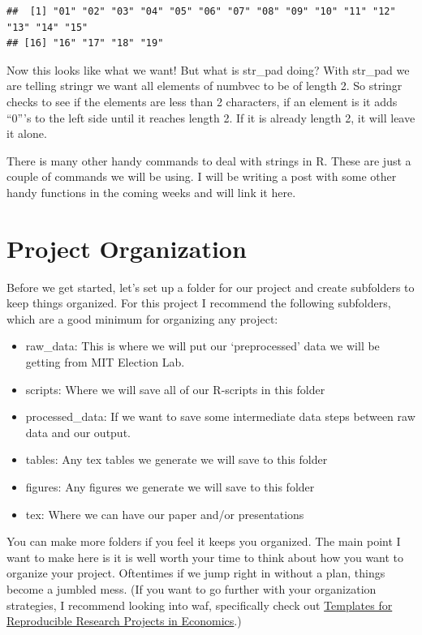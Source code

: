 \documentclass[
]{book}
\providecommand{\tightlist}{%
  \setlength{\itemsep}{0pt}\setlength{\parskip}{0pt}}
\begin{document}
\begin{verbatim}
##  [1] "01" "02" "03" "04" "05" "06" "07" "08" "09" "10" "11" "12" "13" "14" "15"
## [16] "16" "17" "18" "19"
\end{verbatim}

Now this looks like what we want! But what is str\_pad doing? With str\_pad we are telling stringr we want all elements of numbvec to be of length 2. So stringr checks to see if the elements are less than 2 characters, if an element is it adds ``0'''s to the left side until it reaches length 2. If it is already length 2, it will leave it alone.

There is many other handy commands to deal with strings in R. These are just a couple of commands we will be using. I will be writing a post with some other handy functions in the coming weeks and will link it here.

\hypertarget{project-organization}{%
\section{Project Organization}\label{project-organization}}

Before we get started, let's set up a folder for our project and create subfolders to keep things organized. For this project I recommend the following subfolders, which are a good minimum for organizing any project:

\begin{itemize}
\tightlist
\item
  raw\_data: This is where we will put our `preprocessed' data we will be getting from MIT Election Lab.
\item
  scripts: Where we will save all of our R-scripts in this folder
\item
  processed\_data: If we want to save some intermediate data steps between raw data and our output.
\item
  tables: Any tex tables we generate we will save to this folder
\item
  figures: Any figures we generate we will save to this folder
\item
  tex: Where we can have our paper and/or presentations
\end{itemize}

You can make more folders if you feel it keeps you organized. The main point I want to make here is it is well worth your time to think about how you want to organize your project. Oftentimes if we jump right in without a plan, things become a jumbled mess. (If you want to go further with your organization strategies, I recommend looking into waf, specifically check out \href{https://econ-project-templates.readthedocs.io/en/stable/index.html}{Templates for Reproducible Research Projects in Economics}.)
\end{document}
